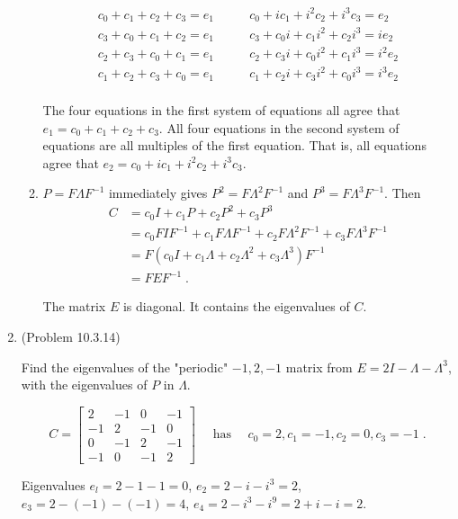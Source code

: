 \documentclass[a4paper]{article}
\begin{document}
\begin{enumerate}
\begin{enumerate}
	\begin{align*}
	c_0 + c_1 + c_2 + c_3 = e_1 \quad & \quad 
	c_0 + ic_1 + i^2c_2 + i^3c_3 = e_2\\
	c_3 + c_0 + c_1 + c_2 = e_1 \quad & \quad 
	c_3 + c_0i + c_1i^2 + c_2i^3 = ie_2 \\
	c_2 + c_3 + c_0 + c_1 = e_1 \quad & \quad 
	c_2 + c_3i + c_0i^2 + c_1i^3 = i^2e_2\\
	c_1 + c_2 + c_3 + c_0 = e_1 \quad & \quad 
	c_1 + c_2i + c_3i^2 + c_0i^3 = i^3e_2\\
	\end{align*}
	
	The four equations in the first system of equations all
	agree that $e_1 = c_0 + c_1 + c_2 + c_3$. All four equations
	in the second system of equations are all multiples of the
	first equation. That is, all equations agree that
	$e_2 = c_0 + ic_1 + i^2c_2 + i^3c_3$.
	
	\item
	$P = F\Lambda F^{-1}$ immediately gives 
	$P^2 = F\Lambda^2 F^{-1}$ and $P^3 = F\Lambda^3 F^{-1}$.
	Then
	\begin{align*}
	C &= c_0I + c_1P + c_2P^2 + c_3P^3 \\
	&= c_0FIF^{-1} + c_1F\Lambda F^{-1} +c_2F\Lambda^2 F^{-1}
	+c_3 F\Lambda^3 F^{-1} \\
	&= F(c_0I + c_1\Lambda + c_2 \Lambda^2 
	+ c_3 \Lambda^3)F^{-1} \\
	&= FEF^{-1} \;.
	\end{align*}
	
	The matrix $E$ is diagonal. It contains the eigenvalues of
	$C$. 

\end{enumerate}

\item{(Problem 10.3.14)}

Find the eigenvalues of the "periodic" $-1,2, -1$ matrix from 
$E = 2I - \Lambda - \Lambda^3$, with the eigenvalues of $P$ in $\Lambda$. 

$$
C=
\begin{bmatrix}
2 & -1 & 0 & -1 \\
-1 & 2 & -1 & 0 \\
0 & -1 & 2 & -1 \\
-1 & 0 & -1 & 2
\end{bmatrix}
\quad \text{ has } \quad
c_0 = 2, c_1 = -1, c_2 = 0, c_3 = -1 \;.
$$

Eigenvalues $e_l = 2-1-1 = 0$, $e_2 = 2-i -i^3 = 2$, $e_3 = 2- (-1) - (-1) = 4$, $e_4 = 2 - i^3 - i^9 = 2 +i -i = 2$. 


\end{enumerate}
\end{document}
